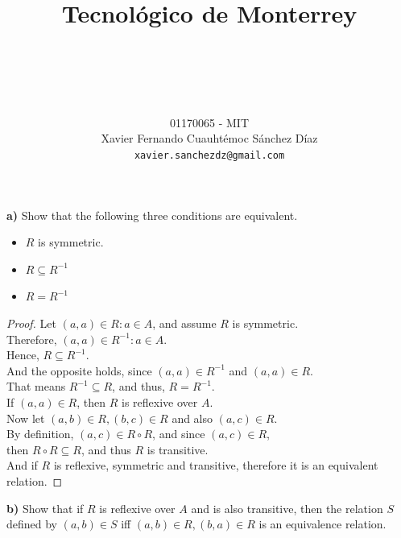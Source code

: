 \documentclass[titlepage, letterpaper, fleqn]{article}
\title{
\vspace{1in}
\textbf{Tecnológico de Monterrey} \\
\vspace{0.5in}
\textmd{\mahclass} \\
\large{\textit{\mahteacher}} \\
\vspace{0.5in}
\textsc{\mahtitle}
\author{01170065  - MIT \\
Xavier Fernando Cuauhtémoc Sánchez Díaz \\
\texttt{xavier.sanchezdz@gmail.com}}
\date{\mahdate}
}
\newcommand{\spacepls}{\vspace{5mm}}
\begin{document}
\begin{titlepage}
\maketitle
\end{titlepage}

%
%

{\large \textbf{a)} Show that the following three conditions are equivalent.}

\begin{itemize}
	\item \(R\) is symmetric.
	\item \(R \subseteq R^{-1}\)
	\item \(R = R^{-1}\)
\end{itemize}

\begin{proof}
Let \((a,a) \in R : a \in A\), and assume \(R\) is symmetric.\\
Therefore, \((a,a) \in R^{-1} : a \in A\).\\
Hence, \(R \subseteq R^{-1}\).\\
And the opposite holds, since \((a,a) \in R^{-1}\) and \((a,a) \in R\).\\
That means \(R^{-1} \subseteq R\), and thus, \(R = R^{-1}\).\\
If \((a,a) \in R\), then \(R\) is reflexive over \(A\).\\
Now let \((a,b) \in R, (b,c) \in R\) and also \((a,c) \in R\).\\
By definition, \((a,c) \in R \circ R\), and since \((a,c) \in R\),\\
then \(R \circ R \subseteq R\), and thus \(R\) is transitive.\\
And if \(R\) is reflexive, symmetric and transitive, therefore it is an equivalent relation.
\end{proof}

\spacepls

{\large \textbf{b)} Show that if \(R\) is reflexive over \(A\) and is also transitive, then the relation \(S\) defined by \((a,b) \in S\) iff \((a,b) \in R, (b,a) \in R\) is an equivalence relation.}
\end{document}
